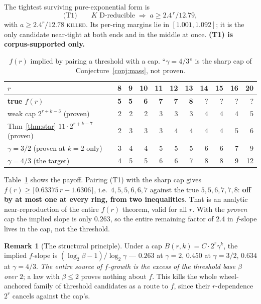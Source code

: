 \documentclass[11pt]{article}
\theoremstyle{definition}
\newtheorem{remark}[theorem]{Remark}
\begin{document}
The tightest surviving pure-exponential form is
\[
   \text{(T1)}\qquad K \text{ D-reducible} \;\Longrightarrow\; a \ge 2.4^{\,r}/12.79,
\]
with $a \ge 2.4^r/12.78$ \textsc{killed}. Its per-ring margins lie in
$[1.001, 1.092]$; it is the only candidate near-tight at both ends and in the middle
at once. \textbf{(T1) is corpus-supported only.}

\begin{table}[t]
\centering\small
\caption{$f(r)$ implied by pairing a threshold with a cap. ``$\gamma=4/3$'' is the
sharp cap of Conjecture~\ref{conj:mass}, not proven.}
\label{tab:implied}
\begin{tabular}{lrrrrrrrrrr}
\toprule
$r$ & 8 & 9 & 10 & 11 & 12 & 13 & 14 & 15 & 16 & 20 \\
\midrule
\textbf{true $f(r)$} & \textbf{5} & \textbf{5} & \textbf{6} & \textbf{7} & \textbf{7} & \textbf{8} & ? & ? & ? & ? \\
weak cap $2^{r+k-3}$ (proven) & 2 & 2 & 2 & 3 & 3 & 3 & 4 & 4 & 4 & 5 \\
Thm~\ref{thm:star} $11\cdot2^{r+k-7}$ (proven) & 2 & 3 & 3 & 3 & 4 & 4 & 4 & 4 & 5 & 6 \\
$\gamma=3/2$ (proven at $k=2$ only) & 3 & 4 & 4 & 5 & 5 & 5 & 6 & 6 & 7 & 9 \\
$\gamma=4/3$ (the target) & 4 & 5 & 5 & 6 & 6 & 7 & 8 & 8 & 9 & 12 \\
\bottomrule
\end{tabular}
\end{table}

Table~\ref{tab:implied} shows the payoff. Pairing (T1) with the sharp cap gives
$f(r) \ge \lceil 0.63375\,r - 1.6306\rceil$, i.e.\ $4,5,5,6,6,7$ against the true
$5,5,6,7,7,8$: \textbf{off by at most one at every ring, from two inequalities}. That
is an analytic near-reproduction of the entire $f(r)$ theorem, valid for all $r$.
With the \emph{proven} cap the implied slope is only $0.263$, so the entire remaining
factor of $2.4$ in $f$-slope lives in the cap, not the threshold.

\begin{remark}[The structural principle]
Under a cap $B(r,k) = C\cdot 2^r\gamma^k$, the implied $f$-slope is
$(\log_2\beta - 1)/\log_2\gamma$ --- $0.263$ at $\gamma=2$, $0.450$ at
$\gamma=3/2$, $0.634$ at $\gamma=4/3$. \emph{The entire source of $f$-growth is the
excess of the threshold base $\beta$ over $2$}; a law with $\beta \le 2$ proves nothing
about $f$. This kills the whole wheel-anchored family of threshold candidates as a
route to $f$, since their $r$-dependence $2^r$ cancels against the cap's.
\end{remark}
\end{document}
